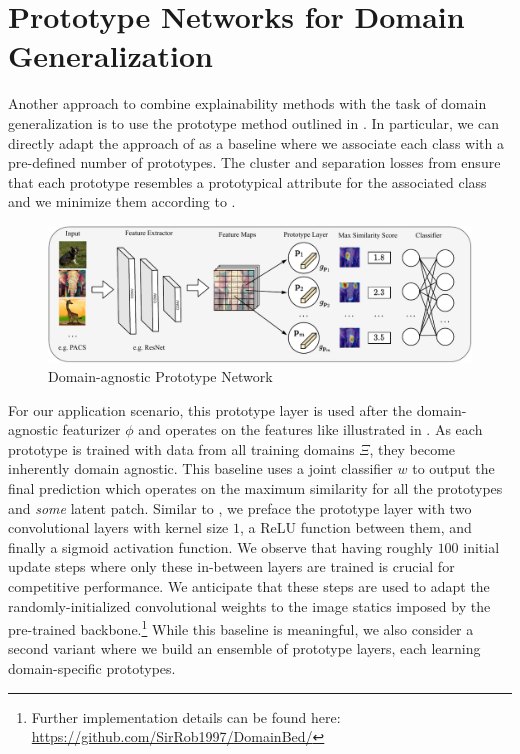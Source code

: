 \section{Prototype Networks for Domain Generalization}
\label{sec:prototype_networks}

Another approach to combine explainability methods with the task of domain generalization is to use the prototype method outlined in .  In particular, we can directly adapt the approach of \citet{ChenLTBRS19} as a baseline where we associate each class with a pre-defined number of prototypes. The cluster and separation losses from  ensure that each prototype resembles a prototypical attribute for the associated class and we minimize them according to .

\begin{figure}[t]
    \centering
    \includegraphics[width=\textwidth]{Figures/Chapter4/prototype_agnostic-cropped.pdf}
    \caption{Domain-agnostic Prototype Network}
    \label{fig:domain_prototype_network}
\end{figure}

For our application scenario, this prototype layer is used after the domain-agnostic featurizer $\phi$ and operates on the features like illustrated in . As each prototype is trained with data from all training domains $\Xi$, they become inherently domain agnostic. This baseline uses a joint classifier $w$ to output the final prediction which operates on the maximum similarity for all the prototypes and \emph{some} latent patch. Similar to \citet{ChenLTBRS19}, we preface the prototype layer with two convolutional layers with kernel size $1$, a ReLU function between them, and finally a sigmoid activation function. We observe that having roughly $100$ initial update steps where only these in-between layers are trained is crucial for competitive performance. We anticipate that these steps are used to adapt the randomly-initialized convolutional weights to the image statics imposed by the pre-trained backbone.\footnote{Further implementation details can be found here: \url{https://github.com/SirRob1997/DomainBed/}} While this baseline is meaningful, we also consider a second variant where we build an ensemble of prototype layers, each learning domain-specific prototypes.


